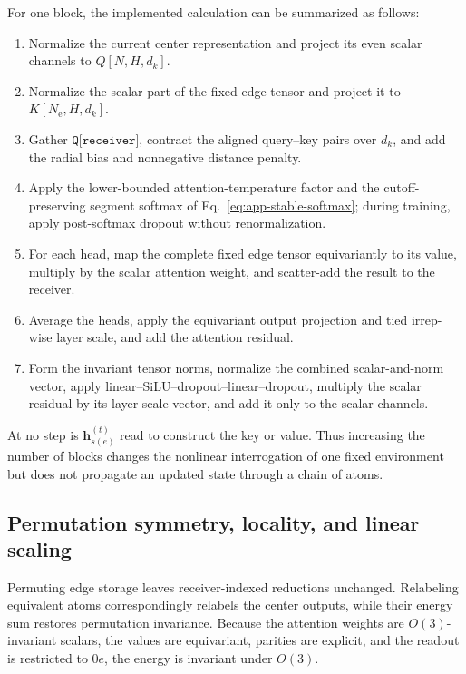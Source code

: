 \documentclass[aps,prx,preprint,notitlepage,superscriptaddress,nofootinbib,floatfix]{revtex4-2}
\newcommand{\vect}[1]{\bm{#1}}
\newif\ifshowrevisions
\newenvironment{draftthirtyoneblock}
  {\ifshowrevisions\color{draftthirtyonecolor}\fi}
  {}
\newcommand{\draftthirtytwo}[1]{%
  \ifshowrevisions\textcolor{draftthirtytwocolor}{#1}\else#1\fi}
\begin{document}
\begin{draftthirtyoneblock}
For one block, the implemented calculation can be summarized as follows:
\begin{enumerate}
 \item Normalize the current center representation and project its even scalar
 channels to \(Q[N,H,d_k]\).
 \item Normalize the scalar part of the fixed edge tensor and project it to
 \(K[N_{\mathrm e},H,d_k]\).
 \item Gather \(\texttt{Q[receiver]}\), contract the aligned query--key pairs over
 \(d_k\), and add the radial bias and nonnegative distance penalty.
 \item Apply the lower-bounded attention-temperature factor and the
 cutoff-preserving segment softmax of Eq.~\eqref{eq:app-stable-softmax};
 during training, apply post-softmax dropout without renormalization.
 \item For each head, map the complete fixed edge tensor equivariantly to its
 value, multiply by the scalar attention weight, and scatter-add the result to
 the receiver.
 \item Average the heads, apply the equivariant output projection and tied
 irrep-wise layer scale, and add the attention residual.
 \item \draftthirtytwo{Form the invariant tensor norms, normalize the combined
 scalar-and-norm vector, apply
 linear--SiLU--dropout--linear--dropout, multiply the scalar residual by its
 layer-scale vector, and add it only to the scalar channels.}
\end{enumerate}
At no step is \(\vect h_{s(e)}^{(t)}\) read to construct the key or value.
Thus increasing the number of blocks changes the nonlinear interrogation of
one fixed environment but does not propagate an updated state through a chain
of atoms.

\subsection{Permutation symmetry, locality, and linear scaling}

Permuting edge storage leaves receiver-indexed reductions unchanged. Relabeling
equivalent atoms correspondingly relabels the center outputs, while their
energy sum restores permutation invariance. Because the attention weights are
\(O(3)\)-invariant scalars, the values are equivariant, parities are explicit,
and the readout is restricted to \(0e\), the energy is invariant under
\(O(3)\).


\end{draftthirtyoneblock}
\end{document}
